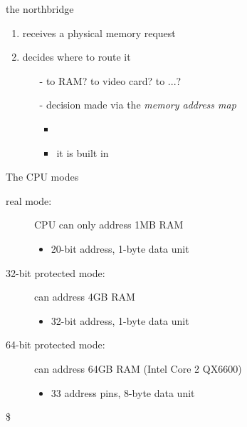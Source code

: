 \begin{frame}%
  \begin{block}{the northbridge}
    \begin{enumerate}
    \item receives a physical memory request
    \item decides where to route it
      \begin{itemize}
      \item[-] to RAM? to video card? to ...?
      \item[-] decision made via the \emph{memory address map}
        \begin{itemize}
        \item {}
        \item it is built in 
        \end{itemize}
      \end{itemize}
    \end{enumerate}
  \end{block}
\end{frame}


\begin{frame}%
  \begin{block}{The CPU modes}
    \begin{description}
    \item[real mode:] CPU can only address 1MB RAM
      \begin{itemize}
      \item 20-bit address, 1-byte data unit
      \end{itemize}
    \item[32-bit protected mode:] can address 4GB RAM
      \begin{itemize}
      \item 32-bit address, 1-byte data unit
      \end{itemize}
    \item[64-bit protected mode:] can address 64GB RAM (Intel Core 2 QX6600)
      \begin{itemize}
      \item 33 address pins, 8-byte data unit
      \end{itemize}
    \end{description}
  \end{block}
  \begin{center}
    \$ 
  \end{center}
\end{frame}

